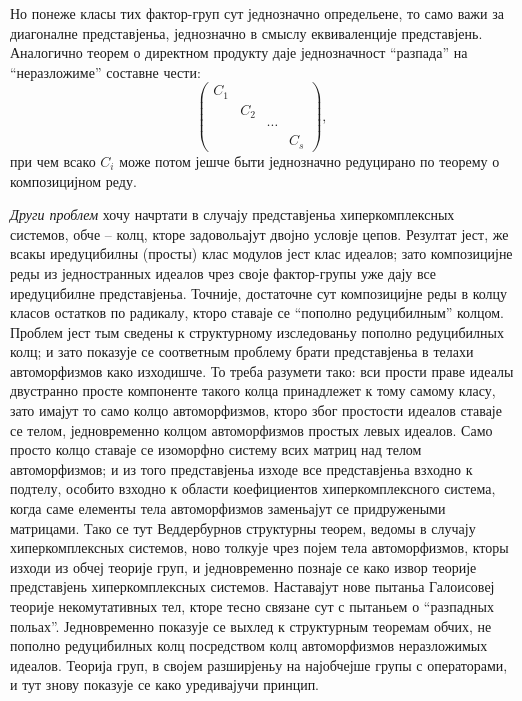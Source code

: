 ﻿\documentclass[11pt]{article}
\begin{document}
Но понеже класы тих фактор-груп сут једнозначно определьене, то само важи за диагоналне представјеньа, једнозначно в смыслу еквиваленције представјень. Аналогично теорем о директном продукту даје једнозначност “разпада” на “неразложиме” составне чести:
\[
\begin{pmatrix}
C_1&&&\\
&C_2&&\\
&&\cdots&\\
&&&C_s
\end{pmatrix},
\]
при чем всако $C_i$ може потом јешче быти једнозначно редуцирано по теорему о композицијном реду.

\emph{Други проблем} хочу начртати в случају представјеньа хиперкомплексных системов, обче -- колц, кторе задовольајут двојно условје цепов. Резултат јест, же всакы иредуцибилны (просты) клас модулов јест клас идеалов; зато композицијне реды из једностранных идеалов чрез своје фактор-групы уже дају все иредуцибилне представјеньа. Точније, достаточне сут композицијне реды в колцу класов остатков по радикалу, кторо ставаје се “пополно редуцибилным” колцом. Проблем јест тым сведены к структурному изследованьу пополно редуцибилных колц; и зато показује се соответным проблему брати представјеньа в телахи автоморфизмов како изходишче. То треба разумети тако: вси прости праве идеалы двустранно просте компоненте такого колца принадлежет к тому самому класу, зато имајут то само колцо автоморфизмов, кторо због простости идеалов ставаје се телом, једновременно колцом автоморфизмов простых левых идеалов. Само просто колцо ставаје се изоморфно систему всих матриц над телом автоморфизмов; и из того представјеньа изходе все представјеньа взходно к подтелу, особито взходно к области коефициентов хиперкомплексного система, когда саме елементы тела автоморфизмов заменьајут се придружеными матрицами. Тако се тут Веддербурнов структурны теорем, ведомы в случају хиперкомплексных системов, ново толкује чрез појем тела автоморфизмов, кторы изходи из обчеј теорије груп, и једновременно познаје се како извор теорије представјень хиперкомплексных системов. Наставајут нове пытаньа Галоисовеј теорије некомутативных тел, кторе тесно связане сут с пытаньем о “разпадных польах”. Једновременно показује се выхлед к структурным теоремам обчих, не пополно редуцибилных колц посредством колц автоморфизмов неразложимых идеалов. Теорија груп, в својем разширјеньу на најобчејше групы с операторами, и тут знову показује се како уредивајучи принцип.
\end{document}

